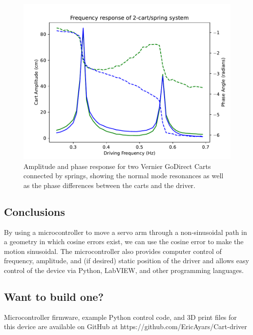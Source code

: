 \documentclass[11 pt]{article}
\begin{document}
\begin{figure}[h]
	\begin{center}
		\includegraphics{2-cart_response}
	\end{center}
	\caption{Amplitude and phase response for two Vernier GoDirect Carts connected by springs, showing the normal mode resonances as well as the phase differences between the carts and the driver.}
	\label{fig:2-carts}
\end{figure}

\subsection*{Conclusions}
By using a microcontroller to move a servo arm through a non-sinusoidal path in a geometry in which cosine errors exist, we can use the cosine error to make the motion sinusoidal.
The microcontroller also provides computer control of frequency, amplitude, and (if desired) static position of the driver and allows easy control of the device via Python, LabVIEW, and other programming languages.

\subsection*{Want to build one?}
Microcontroller firmware, example Python control code, and 3D print files for this device are available on GitHub at https://github.com/EricAyars/Cart-driver
\end{document}
